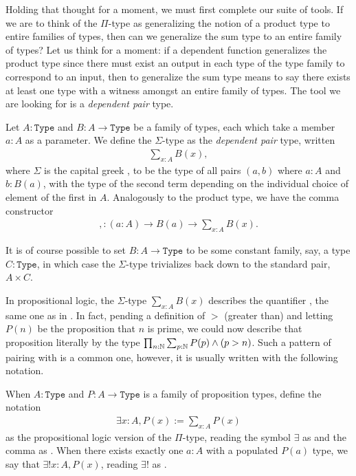 \documentclass[11pt]{article}
\begin{document}
Holding that thought for a moment, we must first complete our suite of tools. If we are to think of the $\Pi$-type as generalizing the notion of a product type to entire families of types, then can we generalize the sum type to an entire family of types? Let us think for a moment: if a dependent function generalizes the product type since there must exist an output in each type of the type family to correspond to an input, then to generalize the sum type means to say there exists at least one type with a witness amongst an entire family of types. The tool we are looking for is a \emph{dependent pair} type.

\begin{definition}
Let $A \colon \mathtt{Type}$ and $B \colon A \to \mathtt{Type}$ be a family of types, each which take a member $a \colon A$ as a parameter. We define the $\Sigma$-type as the \emph{dependent pair} type, written \begin{gather*}
\sum_{x : A} B(x),
\end{gather*}
where $\Sigma$ is the capital greek , to be the type of all pairs $(a,b)$ where $a\colon A$ and $b \colon B(a)$, with the type of the second term depending on the individual choice of element of the first in $A$. Analogously to the product type, we have the comma constructor \begin{gather*}
, \colon (a \colon A) \to B(a) \to \sum_{x : A} B(x).
\end{gather*}
\end{definition}

It is of course possible to set $B \colon A \to \mathtt{Type}$ to be some constant family, say, a type $C \colon \mathtt{Type}$, in which case the $\Sigma$-type trivializes back down to the standard pair, $A \times C$.

In propositional logic, the $\Sigma$-type $\sum_{x : A} B(x)$ describes the quantifier , the same one as in . In fact, pending a definition of $>$ (greater than) and letting $P(n)$ be the proposition that $n$ is prime, we could now describe that proposition literally by the type $\prod_{n : \mathbb{N}} \sum_{p : \mathbb{N}} P(p) \wedge (p > n)$. Such a pattern of pairing  with  is a common one, however, it is usually written with the following notation.

\begin{notation}
When $A\colon \mathtt{Type}$ and $P\colon A \to \mathtt{Type}$ is a family of proposition types, define the notation \begin{gather*}
\exists x : A, P(x) := \sum_{x : A} P(x)
\end{gather*}
as the propositional logic version of the $\Pi$-type, reading the symbol $\exists$ as  and the comma as . When there exists exactly one $a \colon A$  with a populated $P(a)$ type, we say that $\exists ! x \colon A, P(x)$, reading $\exists !$ as .
\end{notation}
\end{document}
